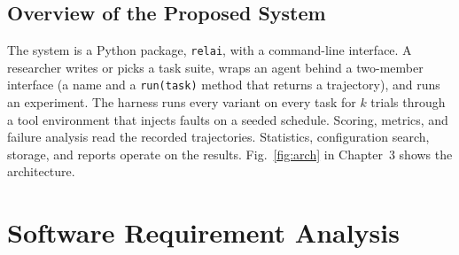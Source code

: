 \documentclass[12pt,a4paper,oneside]{report}
\begin{document}
\section{Overview of the Proposed System}
The system is a Python package, \texttt{relai}, with a command-line interface. A
researcher writes or picks a task suite, wraps an agent behind a two-member interface
(a name and a \texttt{run(task)} method that returns a trajectory), and runs an
experiment. The harness runs every variant on every task for $k$ trials through a tool
environment that injects faults on a seeded schedule. Scoring, metrics, and failure
analysis read the recorded trajectories. Statistics, configuration search, storage, and
reports operate on the results. Fig.~\ref{fig:arch} in Chapter~3 shows the architecture.

\chapter{Software Requirement Analysis}
\end{document}
